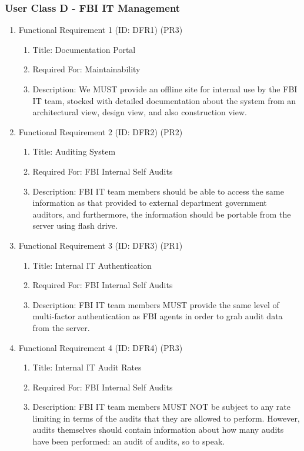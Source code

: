 \documentclass[12pt]{article}
\begin{document}
\subsubsection{User Class D - FBI IT Management}

\begin{enumerate}
    \item Functional Requirement 1 (ID: DFR1) (PR3)
    \begin{enumerate}
        \item Title: Documentation Portal
        \item Required For: Maintainability
        \item Description: We MUST provide an offline site for internal use by the FBI IT team, stocked with detailed
        documentation about the system from an architectural view, design view, and also construction view.
    \end{enumerate}
    \item Functional Requirement 2 (ID: DFR2) (PR2)
    \begin{enumerate}
        \item Title: Auditing System
        \item Required For: FBI Internal Self Audits
        \item Description: FBI IT team members should be able to access the same information as that provided to
        external department government auditors, and furthermore, the information should be portable from the server
        using flash drive.
    \end{enumerate}
    \item Functional Requirement 3 (ID: DFR3) (PR1)
    \begin{enumerate}
        \item Title: Internal IT Authentication
        \item Required For: FBI Internal Self Audits
        \item Description: FBI IT team members MUST provide the same level of multi-factor authentication as FBI
        agents in order to grab audit data from the server.
    \end{enumerate}
    \item Functional Requirement 4 (ID: DFR4) (PR3)
    \begin{enumerate}
        \item Title: Internal IT Audit Rates
        \item Required For: FBI Internal Self Audits
        \item Description: FBI IT team members MUST NOT be subject to any rate limiting in terms of the audits
        that they are allowed to perform. However, audits themselves should contain information about how many
        audits have been performed: an audit of audits, so to speak.
    \end{enumerate}
\end{enumerate}
\end{document}
